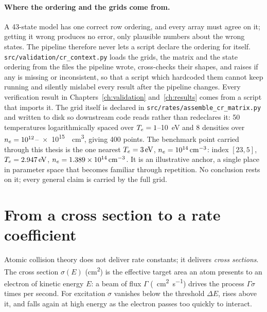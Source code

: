 \paragraph{Where the ordering and the grids come from.} A 43-state model has one
correct row ordering, and every array must agree on it; getting it wrong
produces no error, only plausible numbers about the wrong states. The pipeline
therefore never lets a script declare the ordering for itself.
\texttt{src/validation/cr\_context.py} loads the grids, the matrix and the state
ordering from the files the pipeline wrote, cross-checks their shapes, and
raises if any is missing or inconsistent, so that a script which hardcoded them
cannot keep running and silently mislabel every result after the pipeline
changes. Every verification result in Chapters~\ref{ch:validation}
and~\ref{ch:results} comes from a script that imports it. The grid itself is declared in
\texttt{src/rates/assemble\_cr\_matrix.py} and written to disk so downstream code
reads rather than redeclares it: 50 temperatures logarithmically spaced over
$T_e = 1$--\SI{10}{\electronvolt} and 8 densities over
$n_e = 10^{12}$--\SI{e15}{\per\cubic\centi\metre}, giving 400 points. The
benchmark point carried through this thesis is the one nearest
$T_e = \SI{3}{\electronvolt}$, $n_e = \SI{e14}{\per\cubic\centi\metre}$: index
$[23,5]$, $T_e = \SI{2.947}{\electronvolt}$, $n_e = \SI{1.389e14}{\per\cubic\centi\metre}$. It is an illustrative anchor, a
single place in parameter space that becomes familiar through repetition. No
conclusion rests on it; every general claim is carried by the full grid.

\section{From a cross section to a rate coefficient}
\label{sec:maxwellian}

Atomic collision theory does not deliver rate constants; it delivers
\emph{cross sections}. The cross section $\sigma(E)$ (\si{\square\centi\metre})
is the effective target area an atom presents to an electron of kinetic energy
$E$: a beam of flux $\Gamma$ (\si{\per\square\centi\metre\per\second}) drives the
process $\Gamma\sigma$ times per second. For excitation $\sigma$ vanishes below
the threshold $\Delta E$, rises above it, and falls again at high energy as the
electron passes too quickly to interact.

